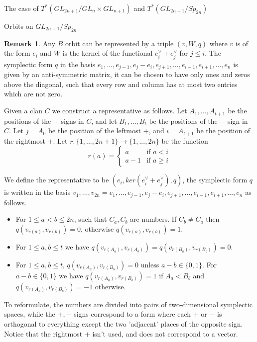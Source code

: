 \documentclass[12pt]{article}
\theoremstyle{plain}
\theoremstyle{definition}
\newtheorem{Remark}[theorem]{Remark}
\begin{document}
\begin{subsection}{The case of $T^*(GL_{2n+1}/GL_n\times GL_{n+1})$ and $T^*(GL_{2n+1}/Sp_{2n})$}
\begin{subsubsection}{Orbits on $GL_{2n+1}/Sp_{2n}$}
\begin{Remark}
        Any $B$ orbit can be represented by a triple $(v,W,q)$ where $v$ is of the form $e_i$ and $W$ is the kernel of the functional $e_i^\vee+ e_{j}^{\vee}$ for $j\leq i$. The symplectic form $q$ in the basis $e_1,\ldots,e_{j-1},e_{j}-e_{i},e_{j+1},\ldots,e_{i-1},e_{i+1},\ldots,e_n$ is given by an anti-symmetric matrix, it can be chosen to have only ones and zeros above the diagonal, such that every row and column has at most two entries which are not zero.

        Given a clan $C$ we construct a representative as follows. Let $A_{1},...,A_{t+1}$ be the positions of the $+$ signs in $C$, and let $B_{1},...,B_{t}$ be the positions of the  $-$ sign in $C$. Let $j=A_{0}$ be the position of the leftmost $+$, and $i=A_{t+1}$ be the position of the rightmost $+$. Let $r:\{1,...,2n+1\}\rightarrow \{1,...,2n\}$ be the function \[
r(a)=
\begin{cases}
a & \text{if } a< i\\
a-1 & \text{if } a\geq i
\end{cases}
\]

        We define the representative to be $(e_{i},ker(e_i^\vee+ e_{j}^{\vee}),q)$, the symplectic form $q$ is written in the basis $v_{1},\ldots,v_{2n}=e_1,\ldots,e_{j-1},e_{j}-e_{i},e_{j+1},\ldots,e_{i-1},e_{i+1},\ldots,e_n$ as follows. 
        \begin{itemize}
            \item For $1\leq a<b\leq 2n$, such that $C_a,C_b$ are numbers. If $C_b\neq C_a$ then $q(v_{r(a)},v_{r(b)})=0$, otherwise $q(v_{r(a)},v_{r(b)})=1$.

            
            \item For $1\leq a,b\leq t$ we have $q(v_{r(A_{a})},v_{r(A_{b})})=q(v_{r(B_{a})},v_{r(B_{b})})=0$.

            
            \item For $1\leq a,b\leq t$, $q(v_{r(A_{a})},v_{r(B_{b})})=0$ unless $a-b\in\{0,1\}$. For $a-b\in\{0,1\}$ we have $q(v_{r(A_{a})},v_{r(B_{b})})=1$ if $A_{a}<B_{b}$ and $q(v_{r(A_{a})},v_{r(B_{b})})=-1$ otherwise. 
        \end{itemize}

        To reformulate, the numbers are divided into pairs of two-dimensional symplectic spaces, while the $+,-$ signs correspond to a form where each $+$ or $-$ is orthogonal to everything except the two 'adjacent' places of the opposite sign. Notice that the rightmost $+$ isn't used, and does not correspond to a vector.
        

\end{Remark}
\end{subsubsection}
\end{subsection}
\end{document}
